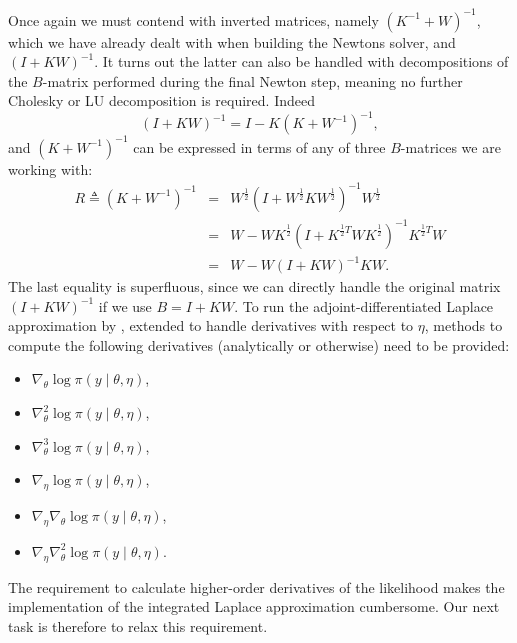 \documentclass[stslayout, noinfoline]{imsart}
\theoremstyle{definition}
\begin{document}
Once again we must contend with inverted matrices, namely $(K^{-1} + W)^{-1}$,
which we have already dealt with when building the Newtons solver,
and $(I + KW)^{-1}$.
It turns out the latter can also be handled with decompositions of the $B$-matrix performed during the final Newton step, meaning no further Cholesky or LU decomposition is required.
Indeed
\begin{equation} \label{eq:R-decomposition}
  (I + KW)^{-1} = I - K(K + W^{-1})^{-1},
\end{equation}
%
and $(K + W^{-1})^{-1}$ can be expressed in terms of any of three $B$-matrices we are working with:
%
\begin{eqnarray}
  R \triangleq (K + W^{-1})^{-1} & = & W^\frac{1}{2} (I + W^\frac{1}{2} K W^\frac{1}{2})^{-1} W^\frac{1}{2} \nonumber \\
    & = & W - W K^\frac{1}{2} (I + K^{\frac{1}{2} T} W K^\frac{1}{2})^{-1} K^{\frac{1}{2} T} W \nonumber \\
    & = & W - W(I + KW)^{-1} KW.
\end{eqnarray}
%
The last equality is superfluous, since we can directly handle the original matrix $(I + KW)^{-1}$
if we use $B = I + KW$.
To run the adjoint-differentiated Laplace approximation by \citet{Margossian:2020-laplace},
extended to handle derivatives with respect to $\eta$,
methods to compute the following derivatives (analytically or otherwise) need to be provided:
\begin{itemize}
 \item $\nabla_\theta \log \pi(y \mid \theta, \eta)$,
 \item $\nabla^2_\theta \log \pi(y \mid \theta, \eta)$,
 \item $\nabla^3_\theta \log \pi(y \mid \theta, \eta)$,
 \item $\nabla_\eta \log \pi(y \mid \theta, \eta)$,
 \item $\nabla_\eta \nabla_\theta \log \pi(y \mid \theta, \eta)$,
 \item $\nabla_\eta \nabla^2_\theta \log \pi(y \mid \theta, \eta)$.
\end{itemize}
%
 The requirement to calculate higher-order derivatives of the likelihood makes the implementation of the integrated Laplace approximation cumbersome.
 Our next task is therefore to relax this requirement.
\end{document}

